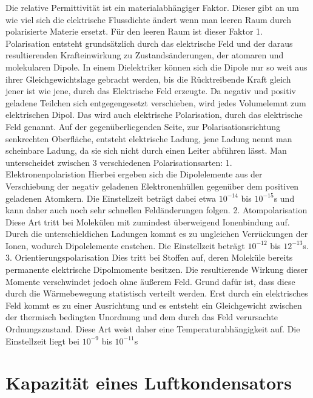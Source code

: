 \documentclass[a4paper,twoside,12pt,DIV=13,BCOR=5mm,numbers=noenddot,cleardoublepage=empty]{scrbook}
\begin{document}
    Die relative Permittivit\"at ist ein materialabh\"angiger Faktor. 
    Dieser gibt an um wie viel sich die elektrische Flussdichte \"andert 
    wenn man leeren Raum durch polarisierte Materie ersetzt. F\"ur den leeren 
    Raum ist dieser Faktor 1.
    \\
    Polarisation entsteht grunds\"atzlich durch das elektrische Feld und 
    der daraus resultierenden Krafteinwirkung zu Zustands\"anderungen, der 
    atomaren und molekularen Dipole. In einem Dielektriker k\"onnen sich die 
    Dipole nur so weit aus ihrer Gleichgewichtslage gebracht werden, bis die 
    R\"ucktreibende Kraft gleich jener ist wie jene, durch das Elektrische 
    Feld erzeugte. Da negativ und positiv geladene Teilchen sich 
    entgegengesetzt verschieben, wird jedes Volumelemnt zum elektrischen Dipol. 
    Das wird auch elektrische Polarisation, durch das elektrische Feld genannt. 
    Auf der gegen\"uberliegenden Seite, zur Polarisationsrichtung senkrechten 
    Oberfl\"ache, entsteht elektrische Ladung, jene Ladung nennt man scheinbare 
    Ladung, da sie sich nicht durch einen Leiter abf\"uhren l\"asst.
    Man unterscheidet zwischen 3 verschiedenen Polarisationsarten:
    1. Elektronenpolaristion
    Hierbei ergeben sich die Dipolelemente aus der Verschiebung der 
    negativ geladenen Elektronenh\"ullen gegen\"uber dem positiven geladenen 
    Atomkern. Die Einstellzeit betr\"agt dabei etwa $10^{-14}$ bis $10^{-15}$s 
    und kann daher auch noch sehr schnellen Feld\"anderungen folgen.
    2. Atompolarisation
    Diese Art tritt bei Molek\"ulen mit zumindest \"uberweigend 
    Ionenbindung auf. Durch die unterschieldichen Ladungen kommt es zu 
    ungleichen Verr\"uckungen der Ionen, wodurch Dipolelemente enstehen. Die 
    Einstellzeit betr\"agt $10^{-12}$ bis $12^{-13}$s.
    3. Orientierungspolarisation
    Dies tritt bei Stoffen auf, deren Molek\"ule bereits permanente elektrische Dipolmomente besitzen. Die resultierende Wirkung dieser Momente verschwindet jedoch ohne \"au\ss{}erem Feld. Grund daf\"ur ist, dass diese durch die W\"armebewegung statistisch verteilt werden.
    Erst durch ein elektrisches Feld kommt es zu einer Ausrichtung und es entsteht ein Gleichgewicht zwischen der thermisch bedingten Unordnung und dem durch das Feld verursachte Ordnungszustand. 
    Diese Art weist daher eine Temperaturabh\"angigkeit auf. Die Einstellzeit 
    liegt bei $10^{-9}$ bis $10^{-11}$s
    
    \section{Kapazit\"at eines Luftkondensators}
\end{document}
